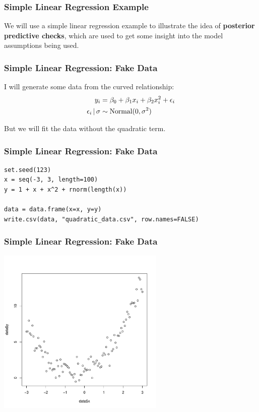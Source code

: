 \documentclass{beamer}
\newcommand{\given}{\,|\,}
\begin{document}
\begin{frame}
\frametitle{Simple Linear Regression Example}
We will use a simple linear regression example to illustrate the idea
of {\bf posterior predictive checks}, which are used to get some insight into
the model assumptions being used.

\end{frame}


\begin{frame}
\frametitle{Simple Linear Regression: Fake Data}
I will generate some data from the curved relationship:
\begin{align}
y_i &= \beta_0 + \beta_1 x_i + \beta_2 x_i^2 + \epsilon_i\\
\epsilon_i \given \sigma &\sim \textnormal{Normal}(0, \sigma^2)
\end{align}

\pause

But we will fit the data without the quadratic term.


\end{frame}

\begin{frame}[fragile]
\frametitle{Simple Linear Regression: Fake Data}
\begin{verbatim}
set.seed(123)
x = seq(-3, 3, length=100)
y = 1 + x + x^2 + rnorm(length(x))

data = data.frame(x=x, y=y)
write.csv(data, "quadratic_data.csv", row.names=FALSE)
\end{verbatim}

\end{frame}


\begin{frame}
\frametitle{Simple Linear Regression: Fake Data}

\begin{center}
\includegraphics[width=0.6\textwidth]{images/quadratic_data.pdf}
\end{center}

\end{frame}
\end{document}
